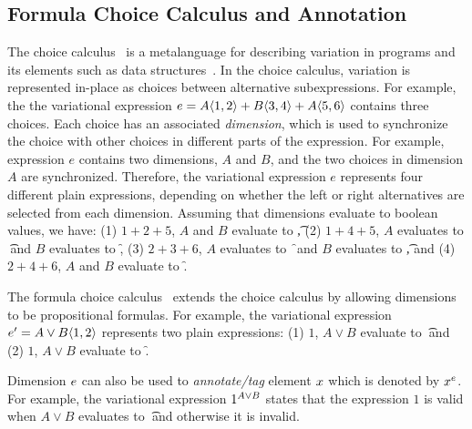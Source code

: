 \subsection{Formula Choice Calculus and Annotation}
\label{sec:fcc}

The choice calculus~\cite{Walk13thesis,EW11tosem} is a metalanguage for
describing variation in programs and its elements such as data 
structures~\cite{Walk14onward,EWC13fosd}.
In the choice calculus, variation is represented in-place as
choices between alternative subexpressions. For example, the
the variational expression 
$e = \chc [A] {1,2} + \chc [B] {3,4} + \chc [A] {5,6}$
 contains three choices.
Each choice has an associated \emph{dimension}, which is used to
synchronize the choice with other choices in different parts
of the expression. For example, expression $e$ contains
two dimensions, $A$ and $B$, and the two choices in dimension
$A$ are synchronized. Therefore, the variational expression
$e$ represents four different plain expressions, depending
on whether the left or right alternatives are selected from each
dimension. Assuming that dimensions evaluate to boolean values, we
have: (1) $1+2+5$, $A$ and $B$ evaluate to \t,
(2) $1+4+5$, $A$ evaluates to \t\ and $B$ evaluates to \f,
(3) $2+3+6$, $A$ evaluates to \f\ and $B$ evaluates to \t,
and (4) $2+4+6$, $A$ and $B$ evaluate to \f.

%
The formula
choice calculus~\cite{HW16fosd} extends the choice calculus 
by allowing dimensions to be propositional formulas. For example,
the variational expression $e' = \chc [A \vee B] {1,2}$ represents
two plain expressions: (1) $1$, $A \vee B$ evaluate to \t\
and (2) $1$, $A \vee B$ evaluate to \f.

%
Dimension $\dimMeta$ can also be used to \emph{annotate/tag} element $\elem$
which is denoted by $\annot \elem$.
For example, the variational expression $\annot [A \vee B] 1$ states that 
the expression $1$ is valid when $A \vee B$ evaluates to \t\ and otherwise it is invalid. 


